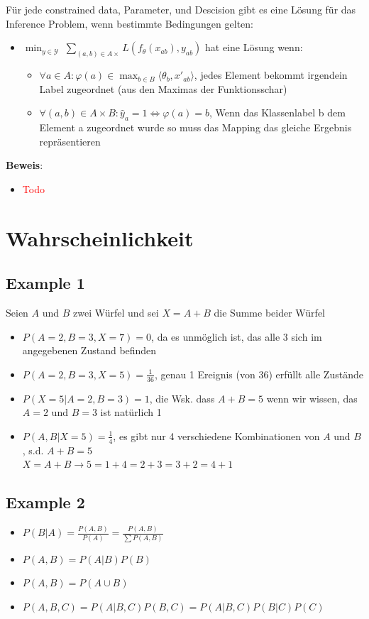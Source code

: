\documentclass[12pt,a4paper]{article}
\newcommand{\red}[1]{\textcolor{red} {#1}}
\begin{document}
Für jede constrained data, Parameter, und Descision gibt es eine Lösung für das Inference Problem, wenn bestimmte Bedingungen gelten:
\begin{itemize}
\item $\displaystyle \min_{y\in \mathcal{Y}} \; \sum_{(a,b)\in A\times}  L(f_\theta(x_{ab}),y_{ab})$ hat eine Lösung wenn:
\begin{itemize}
\item $\displaystyle \forall a \in A: \varphi(a) \in \max_{b\in B} \langle \theta_b,x'_{ab} \rangle$, jedes Element bekommt irgendein Label zugeordnet (aus den Maximas der Funktionsschar)
\item $\forall (a,b)\in A \times B: \hat{y}_{a} = 1 \Leftrightarrow \varphi(a) = b$, Wenn das Klassenlabel b dem Element a zugeordnet wurde so muss das Mapping das gleiche Ergebnis repräsentieren
\end{itemize}
\end{itemize}
\textbf{Beweis}:
\begin{itemize}
\item \red{Todo}
\end{itemize}

\section{Wahrscheinlichkeit}
\subsection{Example 1}
Seien $A$ und $B$ zwei Würfel und sei $X=A+B$ die Summe beider Würfel
\begin{itemize}
\item $P(A=2,B=3,X=7) = 0$, da es unmöglich ist, das alle 3 sich im angegebenen Zustand befinden
\item $P(A=2,B=3,X=5) = \frac{1}{36}$, genau 1 Ereignis (von 36) erfüllt alle Zustände
\item $P(X=5|A=2, B=3) = 1$, die Wsk. dass $A+B =5$ wenn wir wissen, das $A=2$ und $B=3$ ist natürlich 1
\item $P(A,B|X=5) = \frac{1}{4}$, es gibt nur 4 verschiedene Kombinationen von $A$ und $B$, s.d. $A+B=5$\\
$X=A+B \rightarrow 5=1+4=2+3=3+2=4+1$
\end{itemize}
\subsection{Example 2}
\begin{itemize}
\item $P(B|A)=\frac{P(A,B)}{P(A)}=\frac{P(A,B)}{\sum P(A,B)}$
\item $P(A,B)=P(A|B)P(B)$
\item $P(A,B)=P(A\cup B)$
\item $P(A,B,C) = P(A|B,C)P(B,C)=P(A|B,C)P(B|C)P(C)$
\end{itemize}
\end{document}

